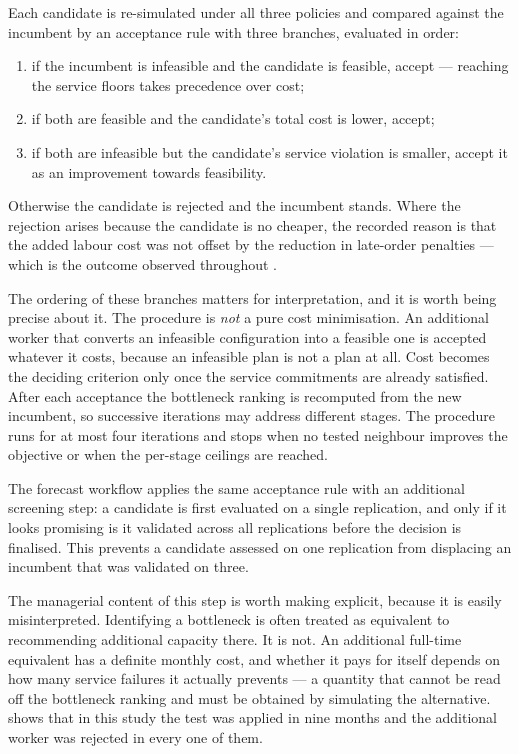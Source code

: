 Each candidate is re-simulated under all three policies and compared against the incumbent by an
acceptance rule with three branches, evaluated in order:

\begin{enumerate}
  \item if the incumbent is infeasible and the candidate is feasible, accept --- reaching the
        service floors takes precedence over cost;
  \item if both are feasible and the candidate's total cost is lower, accept;
  \item if both are infeasible but the candidate's service violation is smaller, accept it as
        an improvement towards feasibility.
\end{enumerate}

\noindent Otherwise the candidate is rejected and the incumbent stands. Where the rejection
arises because the candidate is no cheaper, the recorded reason is that the added labour cost
was not offset by the reduction in late-order penalties --- which is the outcome observed
throughout .

The ordering of these branches matters for interpretation, and it is worth being precise about
it. The procedure is \emph{not} a pure cost minimisation. An additional worker that converts an
infeasible configuration into a feasible one is accepted whatever it costs, because an
infeasible plan is not a plan at all. Cost becomes the deciding criterion only once the service
commitments are already satisfied. After each acceptance the bottleneck ranking is recomputed
from the new incumbent, so successive iterations may address different stages. The procedure
runs for at most four iterations and stops when no tested neighbour improves the objective or
when the per-stage ceilings are reached.

The forecast workflow applies the same acceptance rule with an additional screening step: a
candidate is first evaluated on a single replication, and only if it looks promising is it
validated across all replications before the decision is finalised. This prevents a candidate
assessed on one replication from displacing an incumbent that was validated on three.

The managerial content of this step is worth making explicit, because it is easily
misinterpreted. Identifying a bottleneck is often treated as equivalent to recommending
additional capacity there. It is not. An additional full-time equivalent has a definite monthly
cost, and whether it pays for itself depends on how many service failures it actually prevents
--- a quantity that cannot be read off the bottleneck ranking and must be obtained by
simulating the alternative.  shows that in this study the test was
applied in nine months and the additional worker was rejected in every one of them.

